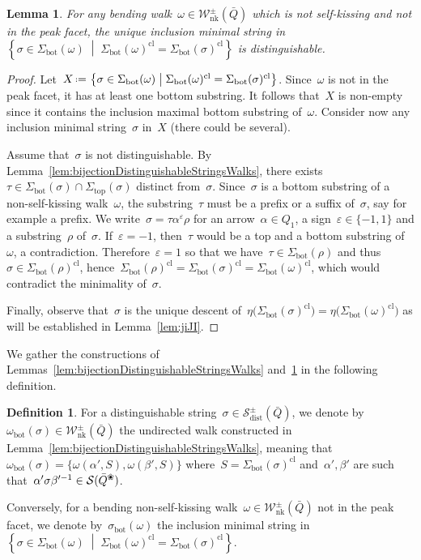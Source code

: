 \documentclass{amsart}
\newtheorem{lemma}[theorem]{Lemma}
\theoremstyle{definition}
\newtheorem{definition}[theorem]{Definition}
\newcommand{\set}[2]{\left\{ #1 \;\middle|\; #2 \right\}} %
\newcommand{\eqdef}{\mbox{\,\raisebox{0.2ex}{\scriptsize\ensuremath{\mathrm:}}\ensuremath{=}\,}} %
\newcommand{\blossom}{^\text{\ding{96}}} %
\newcommand{\strings}{\mathcal{S}} %
\newcommand{\distinguishableStrings}{\mathcal{S}_\mathrm{dist}} %
\newcommand{\NKWalks}{\mathcal{W}_\mathrm{nk}} %
\renewcommand{\top}{\mathrm{top}} %
\newcommand{\bottom}{\mathrm{bot}} %
\newcommand{\closure}[1]{#1^{\mathrm{cl}}} %
\begin{document}
\begin{lemma}
\label{lem:bijectionWalksDistinguishableStrings}
For any bending walk~$\omega \in \NKWalks^\pm(\bar Q)$ which is not self-kissing and not in the peak facet, the unique inclusion minimal string in~$\set{\sigma \in \Sigma_\bottom(\omega)}{\closure{\Sigma_\bottom(\omega)} = \closure{\Sigma_\bottom(\sigma)}}$ is distinguishable.
\end{lemma}

\begin{proof}
Let~$X \eqdef \set{\sigma \in \Sigma_\bottom(\omega)}{\closure{\Sigma_\bottom(\omega)} = \closure{\Sigma_\bottom(\sigma)}}$.
Since~$\omega$ is not in the peak facet, it has at least one bottom substring.
It follows that~$X$ is non-empty since it contains the inclusion maximal bottom substring of~$\omega$.
Consider now any inclusion minimal string~$\sigma$ in~$X$ (there could be several).

Assume that~$\sigma$ is not distinguishable.
By Lemma~\ref{lem:bijectionDistinguishableStringsWalks}, there exists~${\tau \in \Sigma_\bottom(\sigma) \cap \Sigma_\top(\sigma)}$ distinct from~$\sigma$.
Since~$\sigma$ is a bottom substring of a non-self-kissing walk~$\omega$, the substring~$\tau$ must be a prefix or a suffix of~$\sigma$, say for example a prefix.
We write~$\sigma = \tau \alpha^\varepsilon \rho$ for an arrow~$\alpha \in Q_1$, a sign~$\varepsilon \in \{-1,1\}$ and a substring~$\rho$ of~$\sigma$.
If~$\varepsilon = -1$, then~$\tau$ would be a top and a bottom substring of~$\omega$, a contradiction.
Therefore~$\varepsilon = 1$ so that we have~$\tau \in \Sigma_\bottom(\rho)$ and thus~$\sigma \in \closure{\Sigma_\bottom(\rho)}$, hence~$\closure{\Sigma_\bottom(\rho)} = \closure{\Sigma_\bottom(\sigma)} = \closure{\Sigma_\bottom(\omega)}$, which would contradict the minimality of~$\sigma$.

Finally, observe that~$\sigma$ is the unique descent of~$\eta \big( \closure{\Sigma_\bottom(\sigma)} \big) = \eta \big( \closure{\Sigma_\bottom(\omega)} \big)$ as will be established in Lemma~\ref{lem:jiJI}.
\end{proof}

We gather the constructions of Lemmas~\ref{lem:bijectionDistinguishableStringsWalks} and~\ref{lem:bijectionWalksDistinguishableStrings} in the following definition.

\begin{definition}
\label{def:bijectionWalksDistinguishableStrings}
For a distinguishable string~$\sigma \in \distinguishableStrings^\pm(\bar Q)$, we denote by $\omega_\bottom(\sigma) \in \NKWalks^\pm(\bar Q)$ the undirected walk constructed in Lemma~\ref{lem:bijectionDistinguishableStringsWalks}, meaning that~$\omega_\bottom(\sigma) = \{\omega(\alpha',S), \omega(\beta',S)\}$ where~$S = \closure{\Sigma_\bottom(\sigma)}$ and~$\alpha', \beta'$ are such that~$\alpha'\sigma\beta'^{-1} \in \strings(\bar Q\blossom)$.

Conversely, for a bending non-self-kissing walk~$\omega \in \NKWalks^\pm(\bar Q)$ not in the peak facet, we denote by~$\sigma_\bottom(\omega)$ the inclusion minimal string in~$\set{\sigma \in \Sigma_\bottom(\omega)}{\closure{\Sigma_\bottom(\omega)} = \closure{\Sigma_\bottom(\sigma)}}$.
\end{definition}
\end{document}
